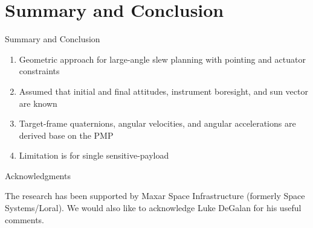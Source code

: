 \documentclass{beamer}
\begin{document}
\section{Summary and Conclusion}
\begin{frame}{Summary and Conclusion}
\begin{block}{}
	\begin{enumerate}
		\item Geometric approach for large-angle slew planning with pointing and actuator constraints 
		\item Assumed that initial and final attitudes, instrument boresight, and sun vector are known 
		\item Target-frame quaternions, angular velocities, and angular accelerations are derived base on the PMP 
		\item Limitation is for single sensitive-payload 
	\end{enumerate}
	
\end{block}
\end{frame}
\begin{frame}{Acknowledgments}
\begin{block}{}
	The research has been supported by Maxar Space Infrastructure (formerly Space Systems/Loral). We would also like to acknowledge Luke DeGalan for his useful comments. 
\end{block}
\end{frame}
%
%
%
\end{document}
